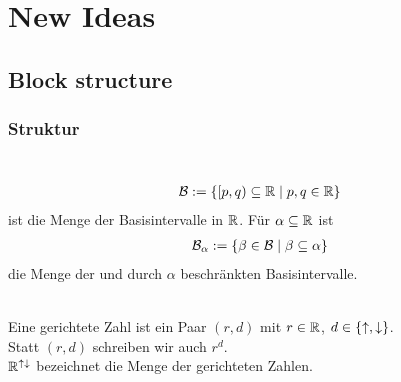 \chapter{New Ideas}


\section{Block structure}


\subsection{Struktur}

\begin{nota}\ \\
    \begin{align*}
      \mathcal{B} := \{[p,q) \subseteq \mathbb{R} \mid p,q \in \mathbb{R}\}
    \end{align*}
    ist die Menge der Basisintervalle in $\mathbb{R}$.
    Für $\alpha \subseteq \mathbb{R}$ ist
    \begin{align*}
        \mathcal{B}_{\alpha} := \{ \beta \in \mathcal{B} \mid \beta \subseteq \alpha\}
    \end{align*}
    die Menge der und durch $\alpha$ beschränkten Basisintervalle.
\end{nota}



\begin{bsp}
 \begin{align*}
  [-5.78,14\pi) &\in \B\\
  [6,4) &\notin \B\\
  [1,1) &\notin \B\\
  [-5.78,14\pi) &\in \B_{[-10,100]}\\
  [-5.78,14\pi) &\notin \B_{[0,1]}
 \end{align*}
\end{bsp}




\begin{dfn}\ \\
    Eine gerichtete Zahl ist ein Paar $(r,d)$ mit $r \in \mathbb{R}$, $d \in \{\uparrow, \downarrow\}$.\\
    Statt $(r,d)$ schreiben wir auch $r^d$.\\
    $\mathbb{R}^{{\uparrow \downarrow}}$ bezeichnet die Menge der gerichteten Zahlen.
\end{dfn}


